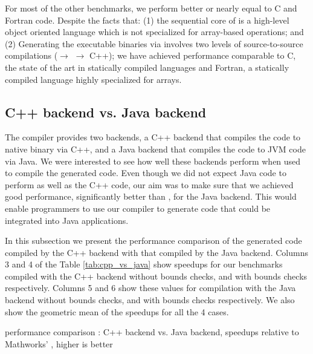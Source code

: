 For most of the other benchmarks, we perform better or nearly equal to C and
Fortran code. Despite the facts that: (1) the sequential core of \xten is a
high-level object oriented language which is not specialized for array-based
operations; and (2) Generating the executable binaries via \mixten involves two
levels of source-to-source compilations (\matlab $\rightarrow$ \xten
$\rightarrow$ C++); we have achieved performance comparable to C, the state of
the art in statically compiled languages and Fortran, a statically compiled
language highly specialized for arrays.
       
\subsection{\xten C++ backend vs. \xten Java backend}

The \xten compiler provides two backends, a C++ backend that compiles the \xten
code to native binary via C++, and a Java backend that compiles the \xten code
to JVM code via Java. We were interested to see how well these backends perform
when used to compile the \mixten generated code. Even though we did not expect
Java code to perform as well as the C++ code, our aim was to make sure that we
achieved good performance, significantly better than \matlab, for the \xten
Java backend.  This would enable \matlab programmers to use our \mixten
compiler to generate code that could be integrated into Java applications. 

In this subsection we present the performance comparison of the \mixten
generated \xten code compiled by the \xten C++ backend with that compiled by
the \xten Java backend. Columns 3 and 4 of the Table \ref{tab:cpp_vs_java} show
speedups for our benchmarks compiled with the \xten C++ backend without bounds
checks, and with bounds checks respectively. Columns 5 and 6 show these values
for compilation with the \xten Java backend without bounds checks, and with
bounds checks respectively. We also show the geometric mean of the speedups for
all the 4 cases. 

\begin{table}[htbp]
\begin{center} 
\begin{footnotesize}

\end{footnotesize}
\caption{\mixten performance comparison : \xten C++ backend vs. \xten
Java backend, speedups relative to Mathworks' \matlab, higher is better} 
\label{tab:cpp_vs_java} 
\end{center} 
\end{table}

